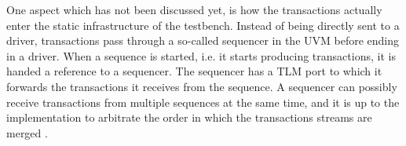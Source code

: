 \documentclass[11pt]{report}
\begin{document}
One aspect which has not been discussed yet, is how the transactions actually enter the static infrastructure of the
testbench. Instead of being directly sent to a driver, transactions pass through a so-called sequencer in the UVM
before ending in a driver. When a sequence is started, i.e. it starts producing transactions, it is handed a
reference to a sequencer. The sequencer has a TLM port to which it forwards the transactions it receives from the
sequence. A sequencer can possibly receive transactions from multiple sequences at the same time, and it is up to the
implementation to arbitrate the order in which the transactions streams are merged \cite[Ch. 23]{salemi2013uvm}.

\begin{comment}
\cite[Ch. 23]{salemi2013uvm}
- in order to make testbench reusable, structure should be separated from data i.e. Transactions
- this also includes the stimulus that is the ordered sequences of transactions
- the ordered sequences could also be used across different test cases -> test case should not decide the specific transactions
- instead test case could operate on collections of transactions which are used like a library

\cite[Ch. 4.3]{mehta2018asic}
- sequence items are the base class for transactions in the UVM
- just class which consist of random and non-random fields with constraints
- sequences represent a stream of sequence items
- in the code they resemble generators
- a body method is invoked and new sequence items are produced as part of the sequence by calling a method
- a special thing is through that when a sequence item is produced, a response may also be obtained which could be another transaction type
- the start\_item method passes the reference to the sequence item to the receiver and waits until a receiver is ready
- when finish\_item is called, the receiver is informed that the item is valid and can be processed
- the sequence is paused until the receiver signals that it is done with the item and a response item may follow that confirmation

\cite[Ch. 23]{salemi2013uvm}
- but what if we want to compose sequences such that the combination is reusable
- can't be done in the test case
- instead a virtual sequence can be used
- it can play other sequences in its body
- sequences can be played in parallel and may be sent to different targets
- this gives control on how interactions on different interfaces are interleaved

\end{comment}
\end{document}
